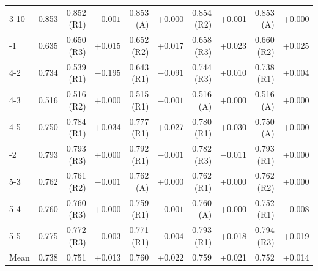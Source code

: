 \documentclass[a4paper,fleqn]{cas-dc}
\begin{document}
\begin{table}[t]
\begin{tabular*}{\textwidth}{@{\extracolsep{\fill}} l r rr rr rr rr}
3-10 & 0.853 & 0.852 (R1) & $-0.001$ & 0.853 (A) & +0.000 & 0.854 (R2) & +0.001 & 0.853 (A) & +0.000 \\
\addlinespace
4-1 & 0.635 & 0.650 (R3) & +0.015 & 0.652 (R2) & +0.017 & 0.658 (R3) & +0.023 & 0.660 (R2) & +0.025 \\
4-2 & 0.734 & 0.539 (R1) & $-0.195$ & 0.643 (R1) & $-0.091$ & 0.744 (R3) & +0.010 & 0.738 (R1) & +0.004 \\
4-3 & 0.516 & 0.516 (R2) & +0.000 & 0.515 (R1) & $-0.001$ & 0.516 (A) & +0.000 & 0.516 (A) & +0.000 \\
4-5 & 0.750 & 0.784 (R1) & +0.034 & 0.777 (R1) & +0.027 & 0.780 (R1) & +0.030 & 0.750 (A) & +0.000 \\
\addlinespace
5-2 & 0.793 & 0.793 (R3) & +0.000 & 0.792 (R1) & $-0.001$ & 0.782 (R3) & $-0.011$ & 0.793 (R1) & +0.000 \\
5-3 & 0.762 & 0.761 (R2) & $-0.001$ & 0.762 (A) & +0.000 & 0.762 (R1) & +0.000 & 0.762 (R2) & +0.000 \\
5-4 & 0.760 & 0.760 (R3) & +0.000 & 0.759 (R1) & $-0.001$ & 0.760 (A) & +0.000 & 0.752 (R1) & $-0.008$ \\
5-5 & 0.775 & 0.772 (R3) & $-0.003$ & 0.771 (R1) & $-0.004$ & 0.793 (R1) & +0.018 & 0.794 (R3) & +0.019 \\
\midrule
Mean & 0.738 & 0.751 & +0.013 & 0.760 & +0.022 & 0.759 & +0.021 & 0.752 & +0.014 \\
\bottomrule
\end{tabular*}
\end{table}

\clearpage
\end{document}
